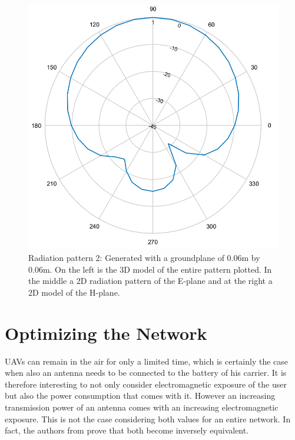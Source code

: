 \begin{figure}[!htb]
  \includegraphics[width=\linewidth]{../images/pattern1/hp.png}
\endminipage
  \caption{Radiation pattern 2: Generated with a groundplane of 0.06m by 0.06m. On the left is the 3D model of the entire pattern plotted. In the middle a 2D radiation pattern of the E-plane and at the right a 2D model of the H-plane.}
 \label{radpattern1}
\end{figure}

\section{Optimizing the Network}
\label{sec:methodology:optimizingTheNetwork}

\gls{UAV}s can remain in the air for only a limited time, which is certainly 
the case when also an antenna needs to be connected to the battery of his carrier. It is therefore
interesting to not only consider electromagnetic exposure of the user but also the power consumption that comes with it. 
However an increasing transmission power of an antenna comes with an increasing electromagnetic exposure. This is not the case considering
both values for an entire network. In fact, the authors from \cite{J1}  prove that both become inversely equivalent.

